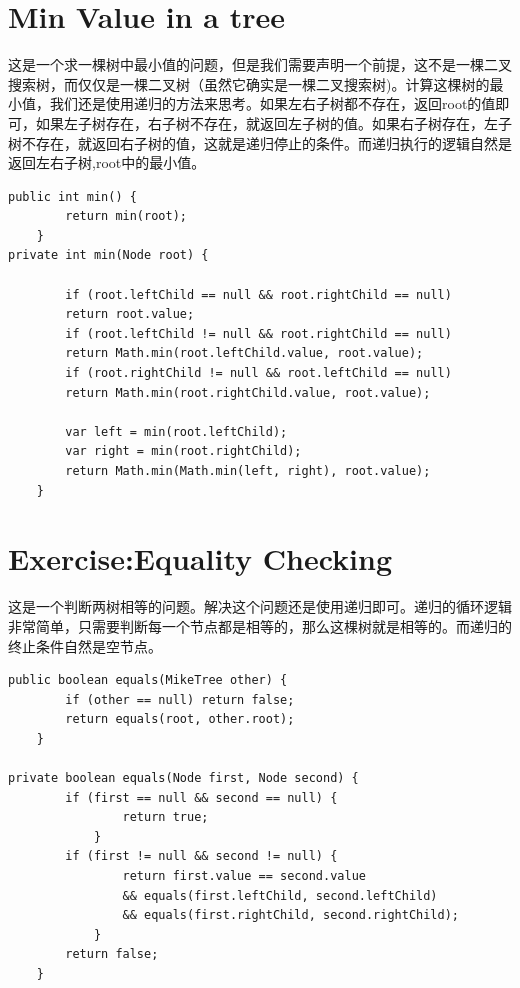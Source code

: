 \documentclass[
	11pt,
	fleqn,
	a4paper,
]{LegrandOrangeBook}
\begin{document}
\section{Min Value in a tree}
这是一个求一棵树中最小值的问题，但是我们需要声明一个前提，这不是一棵二叉搜索树，而仅仅是一棵二叉树（虽然它确实是一棵二叉搜索树)。计算这棵树的最小值，我们还是使用递归的方法来思考。如果左右子树都不存在，返回root的值即可，如果左子树存在，右子树不存在，就返回左子树的值。如果右子树存在，左子树不存在，就返回右子树的值，这就是递归停止的条件。而递归执行的逻辑自然是返回左右子树,root中的最小值。
\begin{verbatim}
public int min() {
        return min(root);
    }
private int min(Node root) {

        if (root.leftChild == null && root.rightChild == null)
        return root.value;
        if (root.leftChild != null && root.rightChild == null)
        return Math.min(root.leftChild.value, root.value);
        if (root.rightChild != null && root.leftChild == null)
        return Math.min(root.rightChild.value, root.value);

        var left = min(root.leftChild);
        var right = min(root.rightChild);
        return Math.min(Math.min(left, right), root.value);
    }
\end{verbatim}
\section{Exercise:Equality Checking}
这是一个判断两树相等的问题。解决这个问题还是使用递归即可。递归的循环逻辑非常简单，只需要判断每一个节点都是相等的，那么这棵树就是相等的。而递归的终止条件自然是空节点。
\begin{verbatim}
public boolean equals(MikeTree other) {
        if (other == null) return false;
        return equals(root, other.root);
    }

private boolean equals(Node first, Node second) {
        if (first == null && second == null) {
                return true;
            }
        if (first != null && second != null) {
                return first.value == second.value
                && equals(first.leftChild, second.leftChild)
                && equals(first.rightChild, second.rightChild);
            }
        return false;
    }
\end{verbatim}
\end{document}
